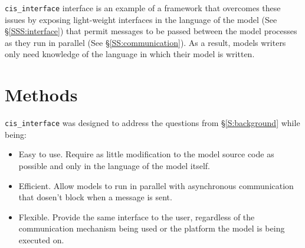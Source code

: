 \documentclass[journal]{IEEEtran}
\newcommand{\cis}{{\tt cis\_interface}{}}
\begin{document}
{\cis} interface is an example of a framework that overcomes these issues by exposing light-weight interfaces in the language of the model (See \S\ref{SSS:interface}) that permit messages to be passed between the model processes as they run in parallel (See \S\ref{SS:communication}). As a result, models writers only need knowledge of the language in which their model is written.

%

\section{Methods}\label{S:methods}

{\cis} was designed to address the questions from \S\ref{S:background} while being:

\begin{itemize}
	\item Easy to use. Require as little modification to the model source code as possible and only in the language of the model itself.
	\item Efficient. Allow models to run in parallel with asynchronous communication that dosen't block when a message is sent.
	\item Flexible. Provide the same interface to the user, regardless of the communication mechanism being used or the platform the model is being executed on.
\end{itemize}
\end{document}
